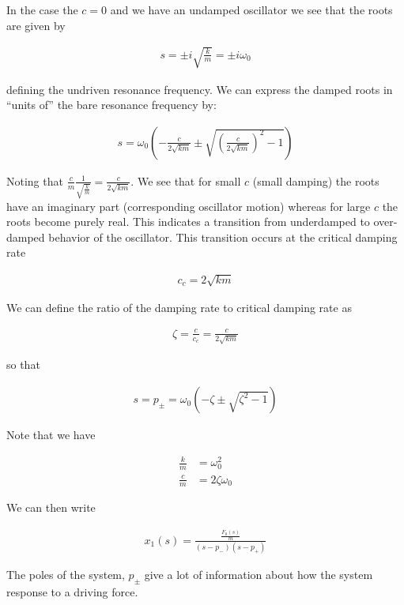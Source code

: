 \documentclass[12pt]{article}
\begin{document}
In the case the $c=0$ and we have an undamped oscillator we see that the roots are given by

\begin{align}
s = \pm i \sqrt{\frac{k}{m}} = \pm i \omega_0
\end{align}

defining the undriven resonance frequency. We can express the damped roots in ``units of'' the bare resonance frequency by:

\begin{align}
s = \omega_0\left(-\frac{c}{2\sqrt{k m}} \pm \sqrt{\left(\frac{c}{2\sqrt{km}} \right)^2 - 1} \right)
\end{align}

Noting that $\frac{c}{m} \frac{1}{\sqrt{\frac{k}{m}}} = \frac{c}{2\sqrt{km}}$. We see that for small $c$ (small damping) the roots have an imaginary part (corresponding oscillator motion) whereas for large $c$ the roots become purely real. This indicates a transition from underdamped to over-damped behavior of the oscillator. This transition occurs at the critical damping rate

\begin{align}
c_c = 2\sqrt{km}
\end{align}

We can define the ratio of the damping rate to critical damping rate as

\begin{align}
\zeta = \frac{c}{c_c} = \frac{c}{2\sqrt{km}}
\end{align}

so that

\begin{align}
s = p_{\pm} = \omega_0\left(-\zeta \pm \sqrt{\zeta^2 -1} \right)
\end{align}

Note that we have

\begin{align}
\frac{k}{m} &= \omega_0^2\\
\frac{c}{m} &= 2 \zeta \omega_0
\end{align}

We can then write

\begin{align}
x_1(s) = \frac{\frac{F_0(s)}{m}}{(s-p_-)(s-p_+)}
\end{align}

The poles of the system, $p_{\pm}$ give a lot of information about how the system response to a driving force.
\end{document}
